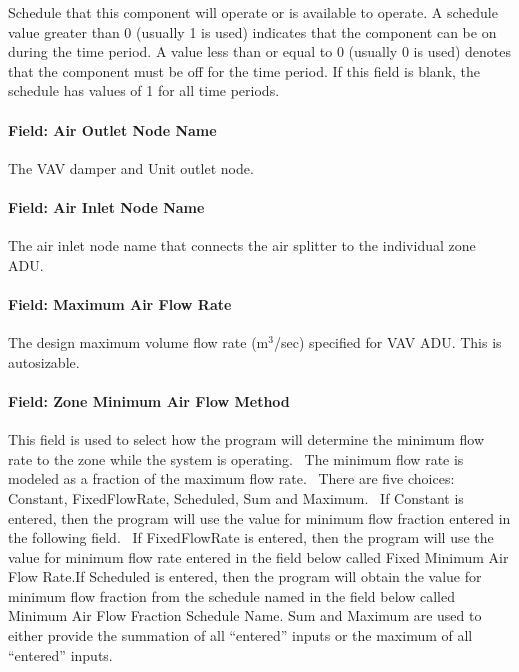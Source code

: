 Schedule that this component will operate or is available to operate. A schedule value greater than 0 (usually 1 is used) indicates that the component can be on during the time period. A value less than or equal to 0 (usually 0 is used) denotes that the component must be off for the time period. If this field is blank, the schedule has values of 1 for all time periods.

\paragraph{Field: Air Outlet Node Name}\label{field-air-outlet-node-name-4}

The VAV damper and Unit outlet node.

\paragraph{Field: Air Inlet Node Name}\label{field-air-inlet-node-name-4}

The air inlet node name that connects the air splitter to the individual zone ADU.

\paragraph{Field: Maximum Air Flow Rate}\label{field-maximum-air-flow-rate-4}

The design maximum volume flow rate (m\(^{3}\)/sec) specified for VAV ADU. This is autosizable.

\paragraph{Field: Zone Minimum Air Flow Method}\label{field-zone-minimum-air-flow-method-1}

This field is used to select how the program will determine the minimum flow rate to the zone while the system is operating.~ The minimum flow rate is modeled as a fraction of the maximum flow rate.~ There are five choices:~ Constant, FixedFlowRate, Scheduled, Sum and Maximum.~ If Constant is entered, then the program will use the value for minimum flow fraction entered in the following field.~ If FixedFlowRate is entered, then the program will use the value for minimum flow rate entered in the field below called Fixed Minimum Air Flow Rate.If Scheduled is entered, then the program will obtain the value for minimum flow fraction from the schedule named in the field below called Minimum Air Flow Fraction Schedule Name. Sum and Maximum are used to either provide the summation of all ``entered'' inputs or the maximum of all ``entered'' inputs.

